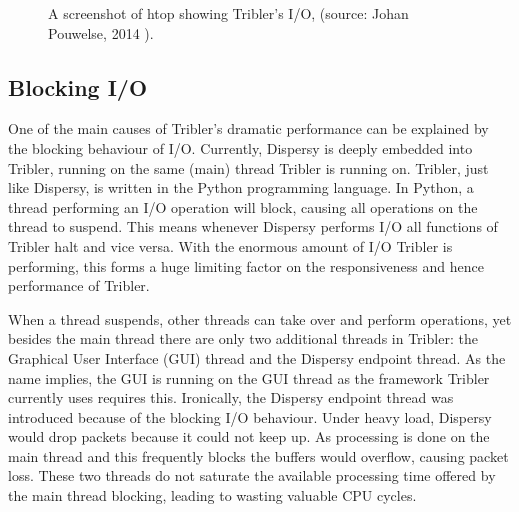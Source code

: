 \begin{figure}[!h]
	\caption{A screenshot of htop showing Tribler's I/O, (source: Johan Pouwelse, 2014 \cite{pouwelse2014reduce}).}
	\label{fig:iotop_tribler_april_2014}
\end{figure}

\subsection{Blocking I/O}
One of the main causes of Tribler's dramatic performance can be explained by the blocking behaviour of I/O.
Currently, Dispersy is deeply embedded into Tribler, running on the same (main) thread Tribler is running on.
Tribler, just like Dispersy, is written in the Python programming language.
In Python, a thread performing an I/O operation will block, causing all operations on the thread to suspend.
This means whenever Dispersy performs I/O all functions of Tribler halt and vice versa.
With the enormous amount of I/O Tribler is performing, this forms a huge limiting factor on the responsiveness and hence performance of Tribler.

When a thread suspends, other threads can take over and perform operations, yet besides the main thread there are only two additional threads in Tribler: the Graphical User Interface (GUI) thread and the Dispersy endpoint thread.
As the name implies, the GUI is running on the GUI thread as the framework Tribler currently uses requires this.
Ironically, the Dispersy endpoint thread was introduced because of the blocking I/O behaviour.
Under heavy load, Dispersy would drop packets because it could not keep up.
As processing is done on the main thread and this frequently blocks the buffers would overflow, causing packet loss.
These two threads do not saturate the available processing time offered by the main thread blocking, leading to wasting valuable CPU cycles.

